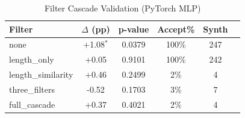 \begin{table}[htbp]
\centering
\caption{Filter Cascade Validation (PyTorch MLP)}
\label{tab:pytorch_filter}
\begin{tabular}{lccccc}
\toprule
Filter & $\Delta$ (pp) & p-value & Accept\% & Synth \\
\midrule
none & +1.08$^{*}$ & 0.0379 & 100\% & 247 \\
length\_only & +0.05 & 0.9101 & 100\% & 242 \\
length\_similarity & +0.46 & 0.2499 & 2\% & 4 \\
three\_filters & -0.52 & 0.1703 & 3\% & 7 \\
full\_cascade & +0.37 & 0.4021 & 2\% & 4 \\
\bottomrule
\end{tabular}
\end{table}